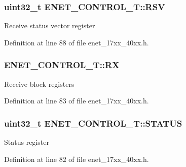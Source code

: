 \subsubsection[{\texorpdfstring{R\+SV}{RSV}}]{ uint32\+\_\+t E\+N\+E\+T\+\_\+\+C\+O\+N\+T\+R\+O\+L\+\_\+\+T\+::\+R\+SV}\hypertarget{structENET__CONTROL__T_a5817f844b6195193d1536edbc770e72f}{}\label{structENET__CONTROL__T_a5817f844b6195193d1536edbc770e72f}
Receive status vector register 

Definition at line 88 of file enet\+\_\+17xx\+\_\+40xx.\+h.

\subsubsection[{\texorpdfstring{RX}{RX}}]{ E\+N\+E\+T\+\_\+\+C\+O\+N\+T\+R\+O\+L\+\_\+\+T\+::\+RX}\hypertarget{structENET__CONTROL__T_a3b07c9a812059f852415f8b5a5261882}{}\label{structENET__CONTROL__T_a3b07c9a812059f852415f8b5a5261882}
Receive block registers 

Definition at line 83 of file enet\+\_\+17xx\+\_\+40xx.\+h.

\subsubsection[{\texorpdfstring{S\+T\+A\+T\+US}{STATUS}}]{ uint32\+\_\+t E\+N\+E\+T\+\_\+\+C\+O\+N\+T\+R\+O\+L\+\_\+\+T\+::\+S\+T\+A\+T\+US}\hypertarget{structENET__CONTROL__T_aaaef8a4b3d2a27e488d5e2e8a236640a}{}\label{structENET__CONTROL__T_aaaef8a4b3d2a27e488d5e2e8a236640a}
Status register 

Definition at line 82 of file enet\+\_\+17xx\+\_\+40xx.\+h.

